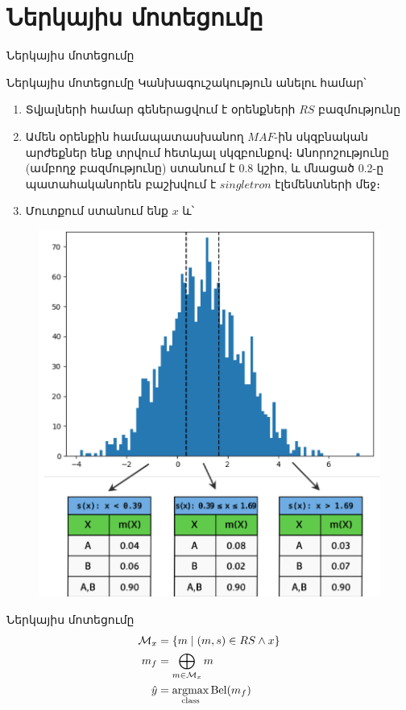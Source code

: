 \documentclass[aspectratio=169]{beamer}
\begin{document}
\section{Ներկայիս մոտեցումը}

\begin{frame}
    \begin{center}
        \Huge Ներկայիս մոտեցումը
    \end{center}
\end{frame}

\begin{frame}{Ներկայիս մոտեցումը}
    Կանխագուշակություն անելու համար՝
\begin{enumerate}
    \item Տվյալների համար գեներացվում է օրենքների $RS$ բազմությունը
    \item Ամեն օրենքին համապատասխանող $MAF$-ին սկզբնական արժեքներ ենք տրվում հետևյալ սկզբունքով։ Անորոշությունը (ամբողջ բազմությունը) ստանում է 0.8 կշիռ, և մնացած 0.2-ը պատահականորեն բաշխվում է $singletron$ էլեմենտների մեջ։
    \item Մուտքում ստանում ենք $x$ և՝
\end{enumerate}

\end{frame}

\begin{frame}
\begin{figure}
    \centering
    \includegraphics[width=0.45\linewidth]{image.png}
    \label{fig:enter-label}
\end{figure}
    
\end{frame}



\begin{frame}{Ներկայիս մոտեցումը}
\begin{align*}
\mathcal{M}_x &= \left\{ m \mid (m, s) \in RS \land x \right\} \\
m_f &= \bigoplus_{m \in \mathcal{M}_x} m \\
\hat{y} &= \underset{{\rm class}}{\mathrm{argmax}} \, {\rm Bel}(m_f)
\end{align*}

\end{frame}
\end{document}
